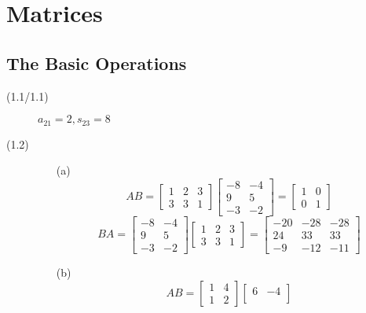 \documentclass[openany]{book}
\begin{document}
\frontmatter
\tableofcontents
\mainmatter
\chapter{Matrices}
\section{The Basic Operations}
\begin{description}
\item[(1.1/1.1)]
$a_{21} = 2, s_{23} = 8$
\item[(1.2)]
\begin{itemize}
\item[(a)]
$$AB = \begin{bmatrix}
1 & 2 & 3 \\
3 & 3 & 1
\end{bmatrix}\begin{bmatrix}
-8 & -4 \\
9 & 5 \\
-3 & -2
\end{bmatrix} = \begin{bmatrix}
1 & 0 \\
0 & 1
\end{bmatrix}$$
$$BA = \begin{bmatrix}
-8 & -4 \\
9 & 5 \\
-3 & -2
\end{bmatrix}\begin{bmatrix}
1 & 2 & 3 \\
3 & 3 & 1
\end{bmatrix} = \begin{bmatrix}
-20 & -28 & - 28 \\
24 & 33 & 33 \\
-9 & -12 & -11
\end{bmatrix}$$
\item[(b)]
$$AB = \begin{bmatrix}
1 & 4 \\
1 & 2
\end{bmatrix}\begin{bmatrix}
6 & -4 \\

\end{bmatrix}$$
\end{itemize}
\end{description}
\end{document}

